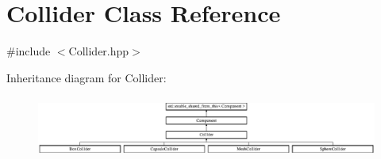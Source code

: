 \hypertarget{class_collider}{}\section{Collider Class Reference}
\label{class_collider}


{\ttfamily \#include $<$Collider.\+hpp$>$}

Inheritance diagram for Collider\+:\begin{figure}[H]
\begin{center}
\leavevmode
\includegraphics[height=2.066421cm]{class_collider}
\end{center}
\end{figure}
